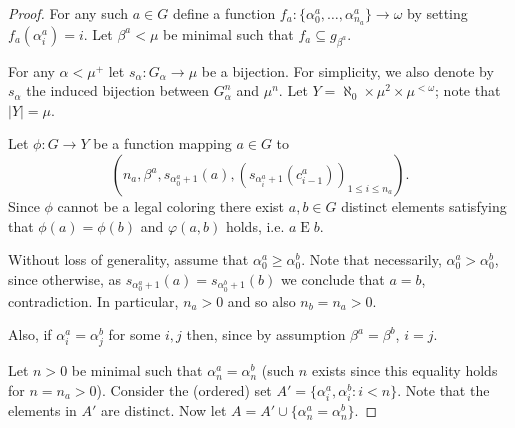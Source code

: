 \documentclass[a4paper]{amsart}
\theoremstyle{plain}
\theoremstyle{definition}
\theoremstyle{remark}
\numberwithin{equation}{section}
\DeclareMathOperator{\tp}{tp}
\begin{document}
\begin{proof}
For any such $a\in G$ define a function $f_a:\{\alpha^a_0,\dots,\alpha_{n_a}^a\}\to \omega$ by setting $f_a(\alpha^a_i)=i$. Let $\beta^a<\mu$ be minimal such that $f_a\subseteq g_{\beta^a}$.

For any $\alpha<\mu^+$ let $s_\alpha :G_\alpha\to \mu$ be a bijection. For simplicity, we also denote by $s_\alpha$ the induced bijection between $G_\alpha^n$ and $\mu^n$. 
Let $Y=\aleph_0 \times \mu^2\times \mu^{<\omega}$; note that $|Y|=\mu$.
%

Let $\phi:G\to Y$ be a function mapping $a\in G$ to \[(n_a, \beta^a,s_{\alpha^a_0+1}(a),(s_{\alpha_i^a+1}(c^a_{i-1}))_{1\leq i\leq n_a}).\] Since $\phi$ cannot be a legal coloring there exist $a,b\in G$ distinct elements satisfying that $\phi(a)=\phi(b)$ and $\varphi(a,b)$ holds, i.e. $a\mathrel{E} b$. 


%
%


Without loss of generality, assume that $\alpha^a_0\geq \alpha^b_0$. Note that necessarily, $\alpha^a_0>\alpha^b_0$, since otherwise, as $s_{\alpha_0^a+1}(a)=s_{\alpha_0^b+1}(b)$ we conclude that $a=b$, contradiction. In particular, $n_a>0$ and so also $n_b=n_a>0$.

Also, if $\alpha_i^a=\alpha^b_j$ for some $i,j$ then, since by assumption $\beta^a=\beta^b$, $i=j$.


Let $n>0$ be minimal such that $\alpha_n^a=\alpha^b_n$ (such $n$ exists since this equality holds for $n=n_a>0$). Consider the (ordered) set $A'=\{\alpha_i^a,\alpha_i^b:i< n\}$. Note that the elements in $A'$ are distinct. Now let $A=A'\cup\{\alpha^a_n=\alpha^b_n\}$.


\end{proof}
\end{document}
